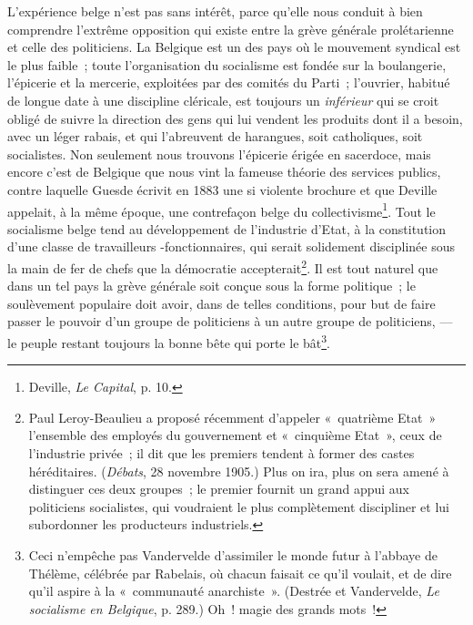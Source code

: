 \documentclass[french,twoside]{book} %
\begin{document}
L’expérience belge n’est pas sans intérêt, parce qu’elle nous conduit à bien comprendre l’extrême opposition qui existe entre la grève générale prolétarienne et celle des politiciens. La Belgique est un des pays où le mouvement syndical est le plus faible ; toute l’organisation du socialisme est fondée sur la boulangerie, l’épicerie et la mercerie, exploitées par des comités du Parti ; l’ouvrier, habitué de longue date à une discipline cléricale, est toujours un \emph{inférieur} qui se croit obligé de suivre la direction des gens qui lui vendent les produits dont il a besoin, avec un léger rabais, et qui l’abreuvent de harangues, soit catholiques, soit socialistes. Non seulement nous trouvons l’épicerie érigée en sacerdoce, mais encore c’est de Belgique que nous vint la fameuse théorie des services publics, contre laquelle Guesde écrivit en 1883 une si violente brochure et que Deville appelait, à la même époque, une contrefaçon belge du collectivisme\footnote{ \noindent Deville, \emph{Le Capital}, p. 10.
 }. Tout le socialisme belge tend au développement de l’industrie d’Etat, à la constitution d’une classe de travailleurs -fonctionnaires, qui serait solidement disciplinée sous la main de fer de chefs que la démocratie accepterait\footnote{ \noindent Paul Leroy-Beaulieu a proposé récemment d’appeler « quatrième Etat » l’ensemble des employés du gouvernement et « cinquième Etat », ceux de l’industrie privée ; il dit que les premiers tendent à former des castes héréditaires. (\emph{Débats}, 28 novembre 1905.) Plus on ira, plus on sera amené à distinguer ces deux groupes ; le premier fournit un grand appui aux politiciens socialistes, qui voudraient le plus complètement discipliner et lui subordonner les producteurs industriels.
 }. Il est tout naturel que dans un tel pays la grève générale soit conçue sous la forme politique ; le soulèvement populaire doit avoir, dans de telles conditions, pour but de faire passer le pouvoir d’un groupe de politiciens à un autre groupe de politiciens, — le peuple restant toujours la bonne bête qui porte le bât\footnote{ \noindent Ceci n’empêche pas Vandervelde d’assimiler le monde futur à l’abbaye de Thélème, célébrée par Rabelais, où chacun faisait ce qu’il voulait, et de dire qu’il aspire à la « communauté anarchiste ». (Destrée et Vandervelde, \emph{Le socialisme en Belgique}, p. 289.) Oh ! magie des grands mots !
 }.\par
\end{document}
